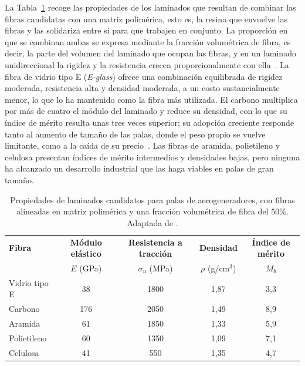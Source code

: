 La Tabla~\ref{tab:materiales_palas} recoge las propiedades de los laminados que resultan de combinar las fibras candidatas con una matriz polimérica, esto es, la resina que envuelve las fibras y las solidariza entre sí para que trabajen en conjunto. La proporción en que se combinan ambas se expresa mediante la fracción volumétrica de fibra, es decir, la parte del volumen del laminado que ocupan las fibras, y en un laminado unidireccional la rigidez y la resistencia crecen proporcionalmente con ella~\parencite{Mishnaevsky2017}. La fibra de vidrio tipo E (\textit{E-glass}) ofrece una combinación equilibrada de rigidez moderada, resistencia alta y densidad moderada, a un costo sustancialmente menor, lo que lo ha mantenido como la fibra más utilizada. El carbono multiplica por más de cuatro el módulo del laminado y reduce su densidad, con lo que su índice de mérito resulta unas tres veces superior; su adopción creciente responde tanto al aumento de tamaño de las palas, donde el peso propio se vuelve limitante, como a la caída de su precio~\parencite{Brondsted2005}. Las fibras de aramida, polietileno y celulosa presentan índices de mérito intermedios y densidades bajas, pero ninguna ha alcanzado un desarrollo industrial que las haga viables en palas de gran tamaño.

\begin{table}[H]
    \centering
    \caption[Propiedades de laminados candidatos para palas de aerogeneradores.]{Propiedades de laminados candidatos para palas de aerogeneradores, con fibras alineadas en matriz polimérica y una fracción volumétrica de fibra del $50\%$. Adaptada de \textcite{Brondsted2005}.}
    \label{tab:materiales_palas}
    \renewcommand{\arraystretch}{1.2}
    \footnotesize
    \begin{tabular}{l c c c c}
        \hline
        \textbf{Fibra} & \textbf{Módulo elástico} & \textbf{Resistencia a tracción} & \textbf{Densidad} & \textbf{Índice de mérito}\\
        & $E$ (GPa) & $\sigma_u$ (MPa) & $\rho$ (g/cm$^3$) & $M_b$\\
        \hline
        Vidrio tipo E & 38  & 1800 & 1{,}87 & 3{,}3 \\
        Carbono      & 176 & 2050 & 1{,}49 & 8{,}9 \\
        Aramida      & 61  & 1850 & 1{,}33 & 5{,}9 \\
        Polietileno  & 60  & 1350 & 1{,}09 & 7{,}1 \\
        Celulosa     & 41  & 550  & 1{,}35 & 4{,}7 \\
        \hline
    \end{tabular}
\end{table}

